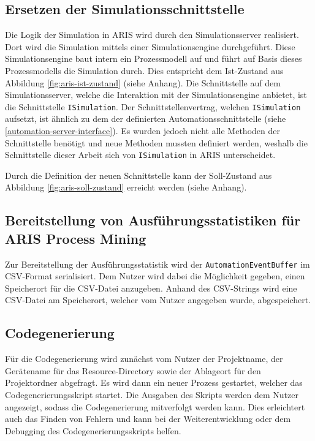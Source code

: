 \subsection{Ersetzen der Simulationsschnittstelle}

Die Logik der Simulation in ARIS wird durch den Simulationsserver realisiert. Dort wird die Simulation mittels einer Simulationsengine durchgeführt. Diese Simulationsengine
baut intern ein Prozessmodell auf und führt auf Basis dieses Prozessmodells die Simulation durch. Dies entspricht dem Ist-Zustand aus Abbildung \ref{fig:aris-ist-zustand} (siehe Anhang). Die Schnittstelle auf dem Simulationsserver,
welche die Interaktion mit der Simulationsengine anbietet, ist die Schnittstelle \texttt{ISimulation}. Der Schnittstellenvertrag, welchen \texttt{ISimulation} aufsetzt, ist
ähnlich zu dem der definierten Automationsschnittstelle (siehe \ref{automation-server-interface}). Es wurden jedoch nicht alle Methoden der Schnittstelle benötigt und neue Methoden mussten
definiert werden, weshalb die Schnittstelle dieser Arbeit sich von \texttt{ISimulation} in ARIS unterscheidet.

\noindent Durch die Definition der neuen Schnittstelle kann der Soll-Zustand aus Abbildung \ref{fig:aris-soll-zustand} erreicht werden (siehe Anhang).

\subsection{Bereitstellung von Ausführungsstatistiken für ARIS Process Mining}

Zur Bereitstellung der Ausführungsstatistik wird der \texttt{AutomationEventBuffer} im CSV-Format serialisiert. Dem
Nutzer wird dabei die Möglichkeit gegeben, einen Speicherort für die CSV-Datei anzugeben. Anhand des CSV-Strings wird
eine CSV-Datei am Speicherort, welcher vom Nutzer angegeben wurde, abgespeichert.

\subsection{Codegenerierung}

Für die Codegenerierung wird zunächst vom Nutzer der Projektname, der Gerätename für das Resource-Directory sowie der Ablageort 
für den Projektordner abgefragt. Es wird dann ein neuer Prozess gestartet, welcher das Codegenerierungsskript startet. Die Ausgaben 
des Skripts werden dem Nutzer angezeigt, sodass die Codegenerierung mitverfolgt werden kann. Dies erleichtert auch das Finden von Fehlern 
und kann bei der Weiterentwicklung oder dem Debugging des Codegenerierungsskripts helfen.

